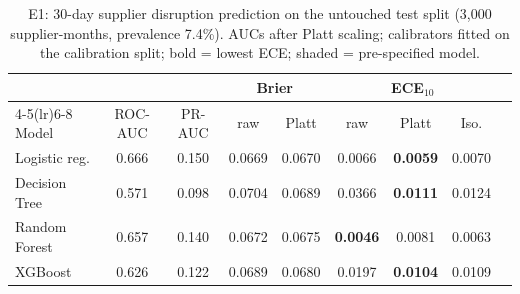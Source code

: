 \begin{table}[t]\centering\caption{E1: 30-day supplier disruption prediction on the untouched test split (3,000 supplier-months, prevalence 7.4\%). AUCs after Platt scaling; calibrators fitted on the calibration split; bold = lowest ECE; shaded = pre-specified model.}\label{tab:exp1}
\scriptsize\setlength{\tabcolsep}{2.4pt}\begin{tabular}{@{}lcccccccc@{}}\toprule
 & & & \multicolumn{2}{c}{Brier} & \multicolumn{3}{c}{ECE$_{10}$}\\\cmidrule(lr){4-5}\cmidrule(lr){6-8}
Model & ROC-AUC & PR-AUC & raw & Platt & raw & Platt & Iso.\\\midrule
Logistic reg. & 0.666 & 0.150 & 0.0669 & 0.0670 & 0.0066 & \textbf{0.0059} & 0.0070\\
Decision Tree & 0.571 & 0.098 & 0.0704 & 0.0689 & 0.0366 & \textbf{0.0111} & 0.0124\\
Random Forest & 0.657 & 0.140 & 0.0672 & 0.0675 & \textbf{0.0046} & 0.0081 & 0.0063\\
\rowcolor{gray!15}XGBoost & 0.626 & 0.122 & 0.0689 & 0.0680 & 0.0197 & \textbf{0.0104} & 0.0109\\
\bottomrule\end{tabular}\end{table}